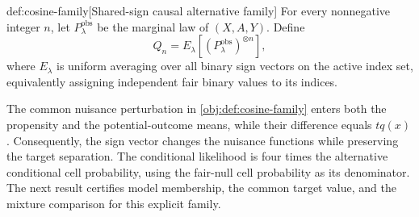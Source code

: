 \documentclass[11pt]{article}
\begin{document}
\begin{definitionv}{def:cosine-family}[Shared-sign causal alternative family]
For every nonnegative integer \(n\), let \(P_\lambda^{\mathrm{obs}}\) be the marginal law of \((X,A,Y)\). Define
\[
Q_n=E_\lambda\!\left[(P_\lambda^{\mathrm{obs}})^{\otimes n}\right],
\]
where \(E_\lambda\) is uniform averaging over all binary sign vectors on the active index set, equivalently assigning independent fair binary values to its indices.
\end{definitionv}

The common nuisance perturbation in \cref{obj:def:cosine-family} enters both the propensity and the potential-outcome means, while their difference equals \(tq(x)\). Consequently, the sign vector changes the nuisance functions while preserving the target separation. The conditional likelihood  is four times the alternative conditional cell probability, using the fair-null cell probability as its denominator. The next result certifies model membership, the common target value, and the mixture comparison for this explicit family.
\end{document}

